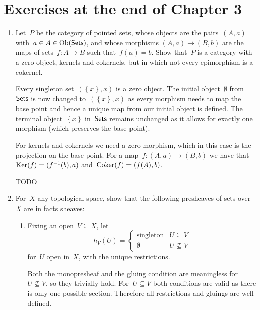 \documentclass[a4paper,11pt,oneside,openany,article]{memoir}
\begin{document}
\clearpage

\chapter{Exercises at the end of Chapter 3}
\begin{enumerate}
  \item Let~$P$ be the category of pointed sets, whose objects are the pairs~$(A,a)$ with~$a\in A\in\operatorname{Ob}(\mathsf{Sets})$, and whose morphisms $(A,a)\to(B,b)$ are the maps of sets~$f\colon A\to B$ such that~$f(a)=b$. Show that~$P$ is a category with a zero object, kernels and cokernels, but in which not every epimorphism is a cokernel.

    \begin{solution}
      Every singleton set~$(\left\{ x \right\},x)$ is a zero object. The initial object~$\emptyset$ from~$\mathsf{Sets}$ is now changed to~$(\left\{ x \right\},x)$ as every morphism needs to map the base point and hence a unique map from our initial object is defined. The terminal object~$\left\{ x \right\}$ in~$\mathsf{Sets}$ remains unchanged as it allows for exactly one morphism (which preserves the base point).

      For kernels and cokernels we need a zero morphism, which in this case is the projection on the base point. For a map~$f\colon(A,a)\to(B,b)$ we have that~$\operatorname{Ker}(f)=(f^{-1}(b),a)$ and~$\operatorname{Coker}(f)=(f(A),b)$.

      TODO
    \end{solution}

  \item For~$X$ any topological space, show that the following presheaves of sets over~$X$ are in facts sheaves:
    \begin{enumerate}
      \item\label{enumerate:exercise-2-a} Fixing an open~$V\subseteq X$, let
        \begin{equation}
          h_V(U)=
          \begin{cases}
            \text{singleton} & U\subseteq V \\
            \emptyset & U\nsubseteq V
          \end{cases}
        \end{equation}
        for~$U$ open in~$X$, with the unique restrictions.

        \begin{solution}
          Both the monopresheaf and the gluing condition are meaningless for~$U\nsubseteq V$, so they trivially hold. For~$U\subseteq V$ both conditions are valid as there is only one possible section. Therefore all restrictions and gluings are well-defined.
        \end{solution}


\end{enumerate}
\end{enumerate}
\end{document}
